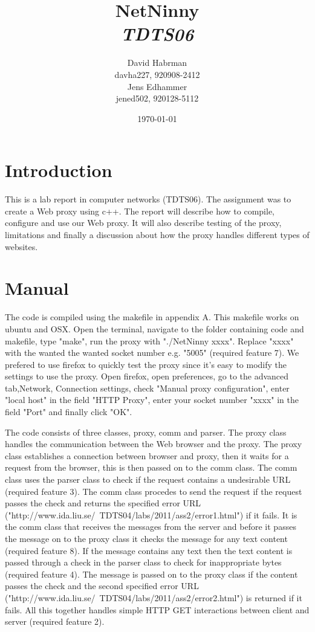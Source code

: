 \documentclass[10pt]{article}
\title{NetNinny\\
\emph{TDTS06}}
\author{David Habrman \\ davha227, 920908-2412\\
Jens Edhammer \\ jened502, 920128-5112 }
\date{\today}
\begin{document}
\maketitle

\newpage
\tableofcontents
\newpage

\section{Introduction}
This is a lab report in computer networks (TDTS06). The assignment was
to create a Web proxy using c++. The report will describe how to compile,
configure and use our Web proxy. It will also describe testing of the proxy,
limitations and finally a discussion about how the proxy handles different
types of websites.

\section{Manual}
The code is compiled using the makefile in appendix A. This makefile works on
ubuntu and OSX. Open the terminal, navigate to the folder containing code and
makefile, type "make", run the proxy with "./NetNinny xxxx". Replace "xxxx"
with the wanted the wanted socket number e.g. "5005" (required feature 7).
We prefered to use firefox to quickly test the proxy since it's easy to
modify the settings to use the proxy. Open firefox, open preferences, go to
the advanced tab,Network, Connection settings, check
"Manual proxy configuration", enter "local host" in the field "HTTP Proxy",
enter your socket number "xxxx" in the field "Port" and finally click "OK".

The code consists of three classes, proxy, comm and parser. The proxy class
handles the communication between the Web browser and the proxy. The proxy class
establishes a connection between browser and proxy, then it waits for a request
from the browser, this is then passed on to the comm class. The comm class
uses the parser class to check if the request contains a undesirable URL
(required feature 3). The comm class procedes to send the request if the
request passes the check and returns the specified error URL
("http://www.ida.liu.se/~TDTS04/labs/2011/ass2/error1.html") if it fails.
It is the comm class that receives the messages from the server and before
it passes the message on to the proxy class it checks the message for any
text content (required feature 8). If the message contains any text then the
text content is passed through a check in the parser class to check for
inappropriate bytes (required feature 4). The message is passed on to the
proxy class if the content passes the check and the second specified error URL
("http://www.ida.liu.se/~TDTS04/labs/2011/ass2/error2.html") is returned if it
fails. All this together handles simple HTTP GET interactions between client
and server (required feature 2).
\end{document}
